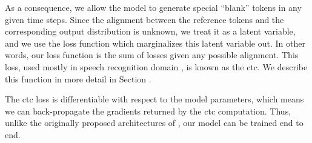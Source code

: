 As a consequence, we allow the model to generate special ``blank'' tokens in
any given time steps. Since the alignment between the reference tokens and the
corresponding output distribution is unknown, we treat it as a latent variable,
and we use the loss function which marginalizes this latent variable out. In
other words, our loss function is the sum of losses given any possible
alignment. This loss, used mostly in speech recognition domain
\citep{graves2006connectionist}, is known as the \acf{ctc}. We describe
this function in more detail in Section .

The \ac{ctc} loss is differentiable with respect to the model parameters,
which means we can back-propagate the gradients returned by the \ac{ctc}
computation. Thus, unlike the originally proposed architectures of
\citet{gu2017nonautoregressive}, our model can be trained end to end.
















